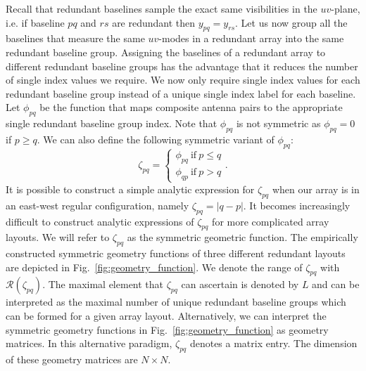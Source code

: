\documentclass[useAMS,usenatbib]{mn2e}
\begin{document}
Recall that redundant baselines sample the exact same visibilities in the $uv$-plane, i.e. if baseline $pq$ and $rs$ are redundant then $y_{pq} = y_{rs}$. 
Let us now group all the baselines that measure the same $uv$-modes in a redundant array into the same redundant baseline group. Assigning the baselines of a redundant array to different redundant baseline groups has the advantage that it reduces the number of single index values we require. We now only require single index values for each redundant baseline group instead of a unique single index label for 
each baseline. Let $\phi_{pq}$ be the function that maps composite antenna pairs to the appropriate single redundant baseline group index. Note that $\phi_{pq}$ is not symmetric as 
$\phi_{pq} = 0$ if $p\geq q$. We can also define the following symmetric variant of $\phi_{pq}$:
\begin{equation}
\zeta_{pq} = 
\begin{cases}
\phi_{pq}~\textrm{if}~p \leq q\\
\phi_{qp}~\textrm{if}~p>q
\end{cases}.
\end{equation} 
It is possible to construct a simple analytic expression for $\zeta_{pq}$ when our array is in an east-west regular configuration, namely $\zeta_{pq} = |q-p|$. 
It becomes increasingly difficult to construct analytic expressions of $\zeta_{pq}$ for more complicated array layouts. 
We will refer to $\zeta_{pq}$ as the symmetric geometric function. The empirically constructed symmetric geometry
functions of three different redundant layouts are depicted in Fig.~\ref{fig:geometry_function}. We denote the range of $\zeta_{pq}$ with $\mathcal{R}(\zeta_{pq})$. The maximal element 
that $\zeta_{pq}$ can ascertain is denoted by $L$ and can be interpreted as the maximal number of unique redundant baseline groups which can be formed for a given 
array layout. Alternatively, we can interpret the symmetric geometry functions in Fig.~\ref{fig:geometry_function} as geometry matrices. In this alternative paradigm, $\zeta_{pq}$ denotes a matrix entry. The dimension of these geometry 
matrices are $N\times N$. 
\end{document}
